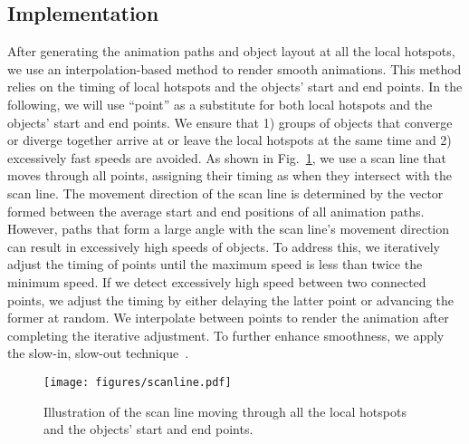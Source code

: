 \subsection{Implementation}
After generating the animation paths and object layout at all the local hotspots, we use an interpolation-based method to render smooth animations.
This method relies on the timing of local hotspots and the objects' start and end points.
In the following, we will use ``point'' as a substitute for both local hotspots and the objects' start and end points.
We ensure that 1) groups of objects that converge or diverge together arrive at or leave the local hotspots at the same time and 2) excessively fast speeds are avoided.
As shown in Fig.~\ref{fig:scanline}, we use a scan line that moves through all points, assigning their timing as when they intersect with the scan line.
The movement direction of the scan line is determined by the vector formed between the average start and end positions of all animation paths.
However, paths that form a large angle with the scan line's movement direction can result in excessively high speeds of objects.
To address this, we iteratively adjust the timing of points until the maximum speed is less than twice the minimum speed.
If we detect excessively high speed between two connected points, we adjust the timing by either delaying the latter point or advancing the former at random.
We interpolate between points to render the animation after completing the iterative adjustment.
To further enhance smoothness, we apply the slow-in, slow-out technique~\cite{dragicevic2011distortion}.
\begin{figure}[t]
\setcounter{figure}{7}
  \centering
  \setlength{\abovecaptionskip}{1.2mm}
  \texttt{[image: figures/scanline.pdf]}
  \caption{
  Illustration of the scan line moving through all the local hotspots and the objects' start and end points.
  }
  \label{fig:scanline}
\end{figure}




